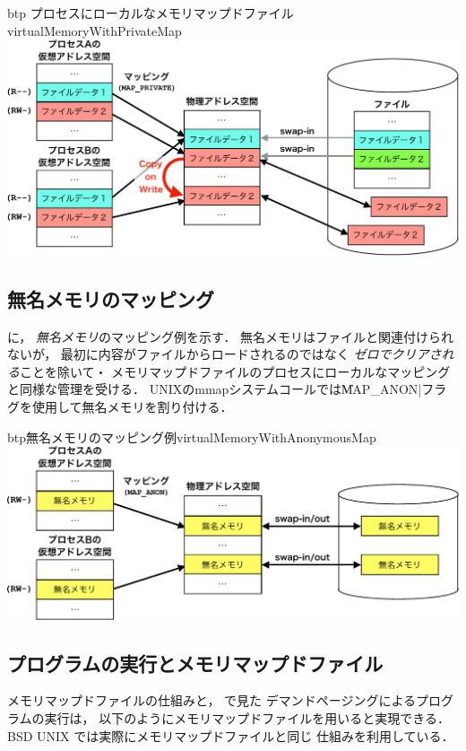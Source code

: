 \begin{myfig}{btp}
  {プロセスにローカルなメモリマップドファイル}{virtualMemoryWithPrivateMap}
  \includegraphics[scale=0.66]{Fig/virtualMemoryWithPrivateMap-crop.pdf}
\end{myfig}

\subsection{無名メモリのマッピング}
に，
\emph{無名メモリ}のマッピング例を示す．
無名メモリはファイルと関連付けられないが，
最初に内容がファイルからロードされるのではなく
\emph{ゼロでクリアされる}ことを除いて・
メモリマップドファイルのプロセスにローカルなマッピングと同様な管理を受ける．
UNIXのmmapシステムコールでは\|MAP_ANON|フラグを使用して無名メモリを割り付ける．

\begin{myfig}{btp}{無名メモリのマッピング例}{virtualMemoryWithAnonymousMap}
  \includegraphics[scale=0.66]{Fig/virtualMemoryWithAnonymousMap-crop.pdf}
\end{myfig}

\subsection{プログラムの実行とメモリマップドファイル}
メモリマップドファイルの仕組みと，
で見た
デマンドページングによるプログラムの実行は，
以下のようにメモリマップドファイルを用いると実現できる．
BSD UNIX では実際にメモリマップドファイルと同じ
仕組みを利用している\cite{execOfFreeBSD}．

